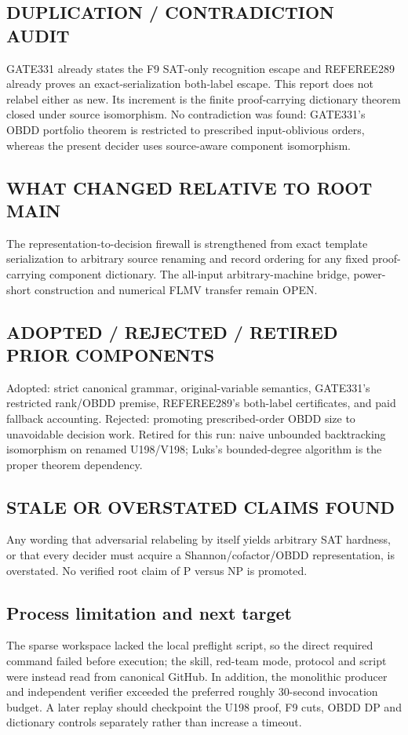 \documentclass[11pt]{article}
\begin{document}
\subsection*{DUPLICATION / CONTRADICTION AUDIT}
GATE331 already states the F9 SAT-only recognition escape and REFEREE289 already
proves an exact-serialization both-label escape.  This report does not relabel
either as new.  Its increment is the finite proof-carrying dictionary theorem
closed under source isomorphism.  No contradiction was found: GATE331's OBDD
portfolio theorem is restricted to prescribed input-oblivious orders, whereas
the present decider uses source-aware component isomorphism.

\subsection*{WHAT CHANGED RELATIVE TO ROOT MAIN}
The representation-to-decision firewall is strengthened from exact template
serialization to arbitrary source renaming and record ordering for any fixed
proof-carrying component dictionary.  The all-input arbitrary-machine bridge,
power-short construction and numerical FLMV transfer remain OPEN.

\subsection*{ADOPTED / REJECTED / RETIRED PRIOR COMPONENTS}
Adopted: strict canonical grammar, original-variable semantics, GATE331's
restricted rank/OBDD premise, REFEREE289's both-label certificates, and paid
fallback accounting.  Rejected: promoting prescribed-order OBDD size to
unavoidable decision work.  Retired for this run: naive unbounded backtracking
isomorphism on renamed U198/V198; Luks's bounded-degree algorithm is the proper
theorem dependency.

\subsection*{STALE OR OVERSTATED CLAIMS FOUND}
Any wording that adversarial relabeling by itself yields arbitrary SAT hardness,
or that every decider must acquire a Shannon/cofactor/OBDD representation, is
overstated.  No verified root claim of P versus NP is promoted.

\subsection*{Process limitation and next target}
The sparse workspace lacked the local preflight script, so the direct required
command failed before execution; the skill, red-team mode, protocol and script
were instead read from canonical GitHub.  In addition, the monolithic producer
and independent verifier exceeded the preferred roughly 30-second invocation
budget.  A later replay should checkpoint the U198 proof, F9 cuts, OBDD DP and
dictionary controls separately rather than increase a timeout.
\end{document}
